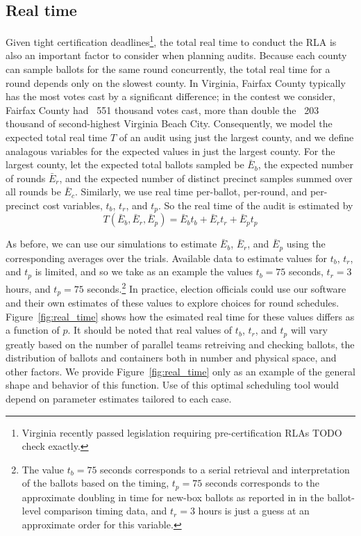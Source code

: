 \subsection{Real time}
Given tight certification deadlines\footnote{Virginia recently passed legislation requiring pre-certification RLAs TODO check exactly.}, the total real time to conduct the RLA is also an important factor to consider when planning audits.
Because each county can sample ballots for the same round concurrently, the total real time for a round depends only on the slowest county. 
In Virginia, Fairfax County typically has the most votes cast by a significant difference; in the contest we consider, Fairfax County had ~551 thousand votes cast, more than double the ~203 thousand of second-highest Virginia Beach City.
Consequently, we model the expected total real time $T$ of an audit using just the largest county, and we define analagous variables for the expected values in just the largest county.
For the largest county, let the expected total ballots sampled be $\bar E_b$, the expected number of rounds $\bar E_r$, and the expected number of distinct precinct samples summed over all rounds be $\bar E_c$.
Similarly, we use real time per-ballot, per-round, and per-precinct cost variables, $t_b$, $t_r$, and $t_p$. So the real time of the audit is estimated by
\begin{equation}
T(\bar E_b, \bar E_r, \bar E_p ) = \bar E_b t_b + \bar E_r t_r + \bar E_p t_p
\label{eq:real_time}
\end{equation}

As before, we can use our simulations to estimate $\bar E_b$, $\bar E_r$, and $\bar E_p$ using the corresponding averages over the trials. 
Available data to estimate values for $t_b$, $t_r$, and $t_p$ is limited, and so we take as an example the values $t_b=75$ seconds, $t_r=3$ hours, and $t_p=75$ seconds.\footnote{The value $t_b=75$ seconds corresponds to a serial retrieval and interpretation of the ballots based on the \cite{RI-report} timing, $t_p=75$ seconds corresponds to the approximate doubling in time for new-box ballots as reported in \cite{RI-report} in the ballot-level comparison timing data, and $t_r=3$ hours is just a guess at an approximate order for this variable.} In practice, election officials could use our software and their own estimates of these values to explore choices for round schedules. Figure~\ref{fig:real_time} shows how the esimated real time for these values differs as a function of $p$. It should be noted that real values of $t_b$, $t_r$, and $t_p$ will vary greatly based on the number of parallel teams retreiving and checking ballots, the distribution of ballots and containers both in number and physical space, and other factors. We provide Figure~\ref{fig:real_time} only as an example of the general shape and behavior of this function. Use of this optimal scheduling tool would depend on parameter estimates tailored to each case.

